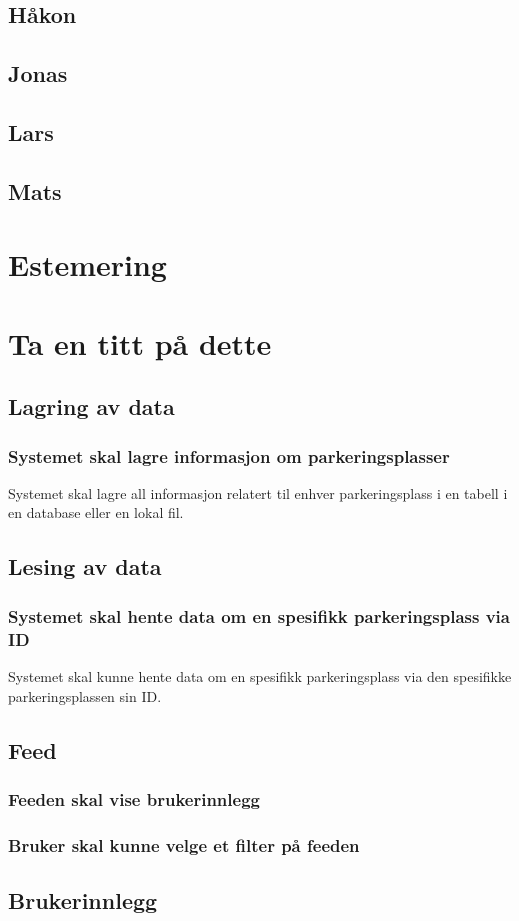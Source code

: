 \documentclass[12pt]{article}
\begin{document}
    \subsection{Håkon}

    \subsection{Jonas}

    \subsection{Lars}

    \subsection{Mats}

\section{Estemering}

\section{Ta en titt på dette}
    \subsection{Lagring av data}

    \subsubsection{Systemet skal lagre informasjon om parkeringsplasser}
    Systemet skal lagre all informasjon relatert til enhver parkeringsplass i en tabell i en database eller en lokal fil.

    \subsection{Lesing av data}

    \subsubsection{Systemet skal hente data om en spesifikk parkeringsplass via ID}
    Systemet skal kunne hente data om en spesifikk parkeringsplass via den spesifikke parkeringsplassen sin ID.

    \subsection{Feed}

    \subsubsection{Feeden skal vise brukerinnlegg}

    \subsubsection{Bruker skal kunne velge et filter på feeden}

    \subsection{Brukerinnlegg}
\end{document}
